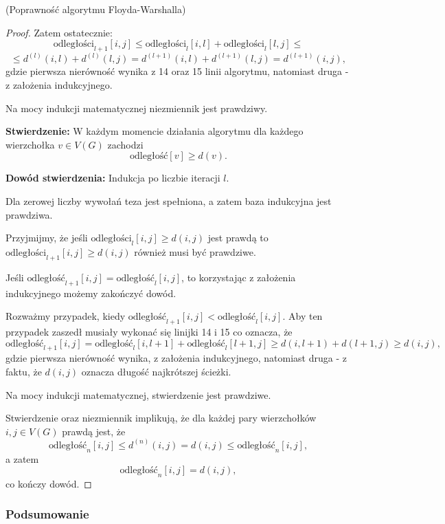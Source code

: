 \begin{theorem}{(Poprawność algorytmu Floyda-Warshalla)}
\begin{proof}
		Zatem ostatecznie:
		\[\text{odległości}_{l+1}[i,j] \leq 
		\text{odległości}_{l}[i,l] + \text{odległości}_{l}[l,j] \leq
		\]
		\[\leq d^{(l)}(i, l) + d^{(l)}(l, j) = d^{(l+1)}(i, l) + d^{(l+1)}(l, j) = d^{(l+1)}(i, j),\]
		gdzie pierwsza nierówność wynika z 14 oraz 15 linii algorytmu,
		natomiast druga - z założenia indukcyjnego.
		
		Na mocy indukcji matematycznej niezmiennik jest prawdziwy.
		
		\textbf{Stwierdzenie:} W każdym momencie działania algorytmu
		dla każdego wierzchołka $v \in V(G)$ zachodzi 
		\[\text{odległość}[v] \geq d(v).\]
		
		\textbf{Dowód stwierdzenia:} Indukcja po liczbie iteracji $l$.
		
		Dla zerowej liczby wywołań teza jest spełniona, a 
		zatem baza indukcyjna jest prawdziwa.
		
		Przyjmijmy, że jeśli $\text{odległości}_l[i, j] \geq d(i, j)$
		jest prawdą to $\text{odległości}_{l+1}[i, j] \geq d(i, j)$
		również musi być prawdziwe.
		
		Jeśli $\text{odległość}_{l+1}[i, j] = \text{odległość}_{l}[i, j]$,
		to korzystając z założenia indukcyjnego możemy zakończyć dowód.
		
		Rozważmy przypadek, kiedy 
		$\text{odległość}_{l+1}[i, j] < \text{odległość}_{l}[i, j]$. 
		Aby ten przypadek zaszedł musiały wykonać się linijki 14 i 15
		co oznacza, że 
		\[\text{odległość}_{l+1}[i, j] = \text{odległość}_{l}[i, l+1] 
		+ \text{odległość}_{l}[l+1, j] \geq d(i, l+1) + d(l+1, j)
		\geq d(i, j),\]
		gdzie pierwsza nierówność wynika, z założenia indukcyjnego,
		natomiast druga - z faktu, że $d(i, j)$ oznacza
		długość najkrótszej ścieżki.
		
		Na mocy indukcji matematycznej, stwierdzenie jest prawdziwe.
		
		Stwierdzenie oraz niezmiennik implikują, że 
		dla każdej pary wierzchołków
		$i, j \in V(G)$ prawdą jest, że 
		\[\text{odległość}_n[i,j] \leq d^{(n)}(i, j) = d(i, j) \leq \text{odległość}_n[i,j],\]
		a zatem
		\[\text{odległość}_n[i,j] = d(i, j),\]
		co kończy dowód.
		
	\end{proof} 
	\label{floydWarshall_proof}
\end{theorem}

\subsubsection{Podsumowanie}